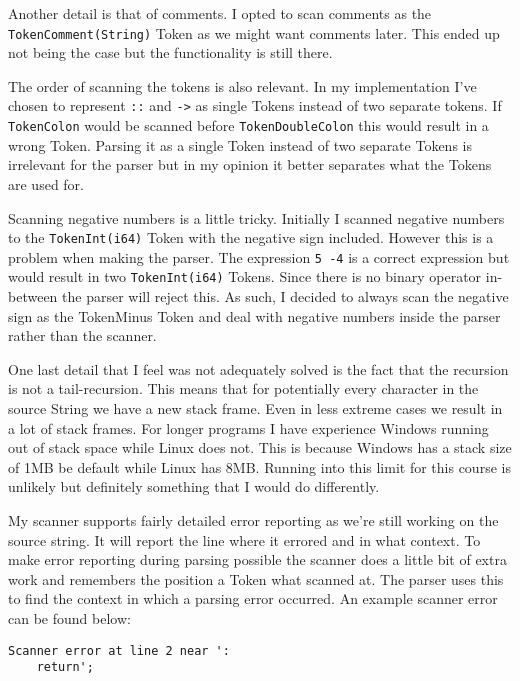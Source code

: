 \documentclass{article}
\begin{document}
Another detail is that of comments. I opted to scan comments as the \texttt{TokenComment(String)} Token as we might want comments later. This ended up not being the case but the functionality is still there.

The order of scanning the tokens is also relevant. In my implementation I've chosen to represent \texttt{::} and \texttt{->} as single Tokens instead of two separate tokens. If \texttt{TokenColon} would be scanned before \texttt{TokenDoubleColon} this would result in a wrong Token. Parsing it as a single Token instead of two separate Tokens is irrelevant for the parser but in my opinion it better separates what the Tokens are used for.

Scanning negative numbers is a little tricky. Initially I scanned negative numbers to the \texttt{TokenInt(i64)} Token with the negative sign included. However this is a problem when making the parser. The expression \texttt{5 -4} is a correct expression but would result in two \texttt{TokenInt(i64)} Tokens. Since there is no binary operator in-between the parser will reject this. As such, I decided to always scan the negative sign as the TokenMinus Token and deal with negative numbers inside the parser rather than the scanner.

One last detail that I feel was not adequately solved is the fact that the recursion is not a tail-recursion. This means that for potentially every character in the source String we have a new stack frame. Even in less extreme cases we result in a lot of stack frames. For longer programs I have experience Windows running out of stack space while Linux does not. This is because Windows has a stack size of 1MB be default while Linux has 8MB. Running into this limit for this course is unlikely but definitely something that I would do differently.

My scanner supports fairly detailed error reporting as we're still working on the source string. It will report the line where it errored and in what context. To make error reporting during parsing possible the scanner does a little bit of extra work and remembers the position a Token what scanned at. The parser uses this to find the context in which a parsing error occurred. An example scanner error can be found below:
\begin{lstlisting}[style=boxed]
Scanner error at line 2 near ':
	return';
\end{lstlisting}
\end{document}

